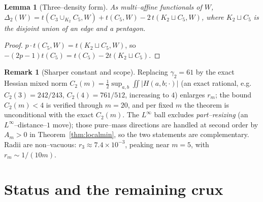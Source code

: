 \documentclass[11pt]{article}
\newtheorem{lemma}[theorem]{Lemma}
\theoremstyle{definition}
\newtheorem{remark}[theorem]{Remark}
\begin{document}
\begin{lemma}[Three--density form]\label{lem:threeform}
As multi--affine functionals of $W$,
$\Delta_2(W)=t(C_3\cup_{K_2}C_5,W)+t(C_5,W)-2\,t(K_2\sqcup C_5,W)$,
where $K_2\sqcup C_5$ is the disjoint union of an edge and a pentagon.
\end{lemma}
\begin{proof}
$p\cdot t(C_5,W)=t(K_2\sqcup C_5,W)$, so
$-(2p-1)t(C_5)=t(C_5)-2t(K_2\sqcup C_5)$.
\end{proof}

\begin{remark}[Sharper constant and scope]
Replacing $\gamma_2=61$ by the exact Hessian mixed norm
$C_2(m)=\tfrac12\sup_{a,b}\iint|H(a,b;\cdot)|$ (an exact rational, e.g.\
$C_2(3)=242/243$, $C_2(4)=761/512$, increasing to $4$) enlarges $r_m$; the bound
$C_2(m)<4$ is verified through $m=20$, and per fixed $m$ the theorem is
unconditional with the exact $C_2(m)$.  The $L^\infty$ ball excludes
\emph{part--resizing} (an $L^\infty$--distance--$1$ move); those pure--mass
directions are handled at second order by $A_m>0$ in Theorem~\ref{thm:localmin},
so the two statements are complementary.  Radii are non--vacuous:
$r_3\approx7.4\times10^{-3}$, peaking near $m=5$, with $r_m\sim1/(10m)$.
\end{remark}

\section{Status and the remaining crux}\label{sec:status}
\end{document}
